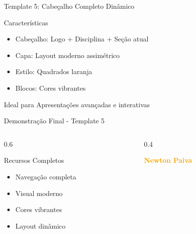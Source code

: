 \documentclass[aspectratio=169]{beamer}
\begin{document}
\begin{frame}{Template 5: Cabeçalho Completo Dinâmico}
    \begin{block}{Características}
        \begin{itemize}
            \item Cabeçalho: Logo + Disciplina + Seção atual
            \item Capa: Layout moderno assimétrico
            \item Estilo: Quadrados laranja
            \item Blocos: Cores vibrantes
        \end{itemize}
    \end{block}
    
    \begin{alertblock}{Ideal para}
        Apresentações avançadas e interativas
    \end{alertblock}
\end{frame}

\begin{frame}{Demonstração Final - Template 5}
    \begin{columns}
        \begin{column}{0.6\textwidth}
            \begin{block}{Recursos Completos}
                \begin{itemize}
                    \item Navegação completa
                    \item Visual moderno
                    \item Cores vibrantes
                    \item Layout dinâmico
                \end{itemize}
            \end{block}
        \end{column}
        \begin{column}{0.4\textwidth}
            \begin{center}
                \newtonlogo[3cm]
                
                \vspace{0.5cm}
                \textcolor{orange}{\textbf{Newton Paiva}}\\
                \textcolor{white}{Inovação}
            \end{center}
        \end{column}
    \end{columns}
\end{frame}
\end{document}
